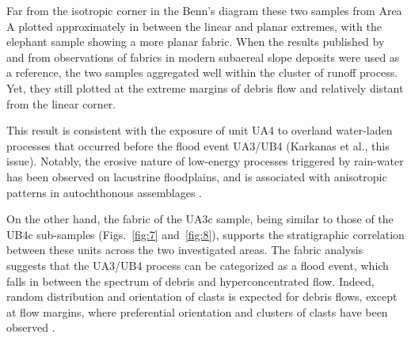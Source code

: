 \documentclass[preprint,authoryear,times]{elsarticle} %
\begin{document}
Far from the isotropic corner in the Benn's diagram these two samples from Area A plotted approximately in between the linear and planar extremes, with the elephant sample showing a more planar fabric. When the results published by \cite{Bertran1997} and \cite{Lenoble2004} from observations of fabrics in modern subaereal slope deposits were used as a reference, the two samples aggregated well within the cluster of runoff process. Yet, they still plotted at the extreme margins of debris flow and relatively distant from the linear corner.


This result is consistent with the exposure of unit UA4 to overland water-laden processes that occurred before the flood event UA3/UB4 (Karkanas et al., this issue). Notably, the erosive nature of low-energy processes triggered by rain-water has been observed on lacustrine floodplains, and is associated with anisotropic patterns in autochthonous assemblages \citep{Cobo-Sanchez2014,Dominguez-Rodrigo2014,Garcia-Moreno2016}.

On the other hand, the fabric of the UA3c sample, being similar to those of the UB4c sub-samples (Figs.~\ref{fig:7} and~\ref{fig:8}), supports the stratigraphic correlation between these units across the two investigated areas. The fabric analysis suggests that the UA3/UB4 process can be categorized as a flood event, which falls in between the spectrum of debris and hyperconcentrated flow. Indeed, random distribution and orientation of clasts is expected for debris flows, except at flow margins, where preferential orientation and clusters of clasts have been observed \citep{Pierson2005}.

\end{document}
